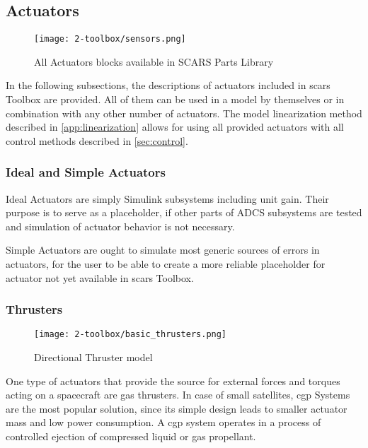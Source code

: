 \subsection{Actuators}\label{sec:actuators}
    \begin{figure}[H]
        \centering
        \texttt{[image: 2-toolbox/sensors.png]}
        \caption{All Actuators blocks available in SCARS Parts Library}
        \label{fig:sensors}
    \end{figure}
    In the following subsections, the descriptions of actuators included in \ac{scars} Toolbox are provided. All of them can be used in a model by themselves or in combination with any other number of actuators. The model linearization method described in \autoref{app:linearization} allows for using all provided actuators with all control methods described in \autoref{sec:control}. 

    \subsubsection{Ideal and Simple Actuators}
        Ideal Actuators are simply Simulink subsystems including unit gain. Their purpose is to serve as a placeholder, if other parts of ADCS subsystems are tested and simulation of actuator behavior is not necessary.

        Simple Actuators are ought to simulate most generic sources of errors in actuators, for the user to be able to create a more reliable placeholder for actuator not yet available in \ac{scars} Toolbox.


    \subsubsection{Thrusters}

        \begin{figure}[H]
            \centering
            \texttt{[image: 2-toolbox/basic\_thrusters.png]}
            \caption{Directional Thruster model}
            \label{fig:basic_thrusters}
        \end{figure}

        One type of actuators that provide the source for external forces and torques acting on a spacecraft are gas thrusters. In case of small satellites, \ac{cgp} Systems are the most popular solution, since its simple design leads to smaller actuator mass and low power consumption. A \ac{cgp} system operates in a process of controlled ejection of compressed liquid or gas propellant. 
        
